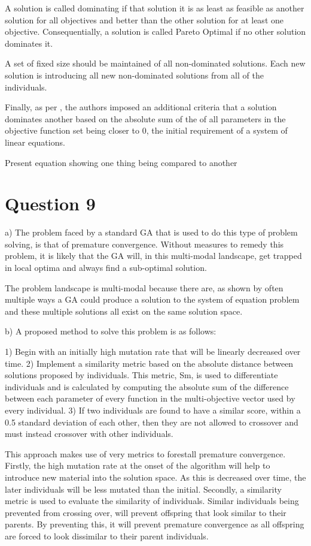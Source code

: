 \documentclass[12pt]{article}
\begin{document}
	A solution is called dominating if that solution it is as least as feasible as another solution for all objectives and better than the other solution for at least one objective. Consequentially, a solution is called Pareto Optimal if no other solution dominates it.

	A set of fixed size should be maintained of all non-dominated solutions. Each new solution is introducing all new non-dominated solutions from all of the individuals. 

	Finally, as per \cite{Grosan2008}, the authors imposed an additional criteria that a solution dominates another based on the absolute sum of the of all parameters in the objective function set being closer to 0, the initial requirement of a system of linear equations.

	{Present equation showing one thing being compared to another}

\section{Question 9}
a)
The problem faced by a standard GA that is used to do this type of problem solving, is that of premature convergence. Without measures to remedy this problem, it is likely that the GA will, in this multi-modal landscape, get trapped in local optima and always find a sub-optimal solution.	

The problem landscape is multi-modal because there are, as shown by \cite{Grosan2008} often multiple ways a GA could produce a solution to the system of equation problem and these multiple solutions all exist on the same solution space.

b) A proposed method to solve this problem is as follows:

	1) Begin with an initially high mutation rate that will be linearly decreased over time.
	2) Implement a similarity metric based on the absolute distance between solutions proposed by individuals. This metric, Sm, is used to differentiate individuals and is calculated by computing the absolute sum of the difference between each parameter of every function in the multi-objective vector used by every individual.
	3) If two individuals are found to have a similar score, within a 0.5 standard deviation of each other, then they are not allowed to crossover and must instead crossover with other individuals.

	This approach makes use of very metrics to forestall premature convergence. Firstly, the high mutation rate at the onset of the algorithm will help to introduce new material into the solution space. As this is decreased over time, the later individuals will be less mutated than the initial. Secondly, a similarity metric is used to evaluate the similarity of individuals. Similar individuals being prevented from crossing over, will prevent offspring that look similar to their parents. By preventing this, it will prevent premature convergence as all offspring are forced to look dissimilar to their parent individuals.
\end{document}
